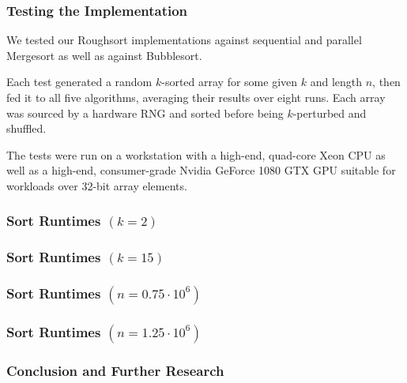 \documentclass[10pt, xcolor={dvipsnames}, aspectratio=169]{beamer}
\begin{document}
\begin{frame}
\frametitle{Testing the Implementation}
We tested our Roughsort implementations against sequential and parallel Mergesort as well as against Bubblesort. \newline

Each test generated a random $k$-sorted array for some given $k$ and length $n$, then fed it to all five algorithms, averaging
  their results over eight runs. Each array was sourced by a hardware RNG and sorted before being
  $k$-perturbed and shuffled. \newline

The tests were run on a workstation with a high-end, quad-core Xeon CPU as well as a high-end, consumer-grade
  Nvidia GeForce 1080 GTX GPU suitable for workloads over 32-bit array elements.
\end{frame}

\begin{frame}
\frametitle{Sort Runtimes $(k = 2)$}
\begin{figure}
\scalebox{0.4}{}
\end{figure}
\end{frame}

\begin{frame}
\frametitle{Sort Runtimes $(k = 15)$}
\begin{figure}
\scalebox{0.4}{}
\end{figure}
\end{frame}

\begin{frame}
\frametitle{Sort Runtimes $(n = 0.75 \cdot 10^6)$}
\begin{figure}
\scalebox{0.4}{}
\end{figure}
\end{frame}

\begin{frame}
\frametitle{Sort Runtimes $(n = 1.25 \cdot 10^6)$}
\begin{figure}
\scalebox{0.4}{}
\end{figure}
\end{frame}

\begin{frame}
\frametitle{}
\end{frame}

\begin{frame}
\frametitle{}
\end{frame}

\begin{frame}
\frametitle{Conclusion and Further Research}
\end{frame}
\end{document}
